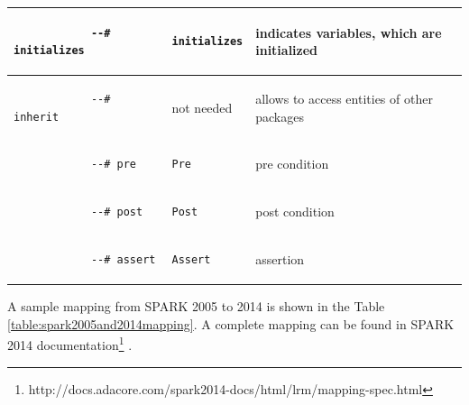 \begin{center}
\begin{longtable}{| p{1.3in} | p{1.3in} | p{3.4in} |}
		\\ \hline

		\begin{lstlisting}
			--# initializes
		\end{lstlisting} 
		& 
		\begin{lstlisting}[language=ada2012]
			initializes
		\end{lstlisting} 
		& 
		indicates variables, which are initialized

		\\ \hline

		\begin{lstlisting}
			--# inherit
		\end{lstlisting} 
		& 
		not needed
		& 
		allows to access entities of other packages

		\\ \hline

		\begin{lstlisting}
			--# pre
		\end{lstlisting} 
		& 
		\begin{lstlisting}[language=ada2012]
			Pre
		\end{lstlisting} 
		& 
		pre condition

		\\ \hline
		

		\begin{lstlisting}
			--# post
		\end{lstlisting} 
		& 
		\begin{lstlisting}[language=ada2012]
			Post
		\end{lstlisting} 
		& 
		post condition

		\\ \hline
		

		\begin{lstlisting}
			--# assert
		\end{lstlisting} 
		& 
		\begin{lstlisting}[language=ada2012]
			Assert
		\end{lstlisting} 
		& 
		assertion

		\\ \hline
	\end{longtable}
\end{center}
\doublespacing

A sample mapping from SPARK 2005 to 2014 is shown in the Table \ref{table:spark2005and2014mapping}. A complete mapping can be found in SPARK 2014 documentation\footnote{http://docs.adacore.com/spark2014-docs/html/lrm/mapping-spec.html} \cite{Spark2014refManual:Online}.


